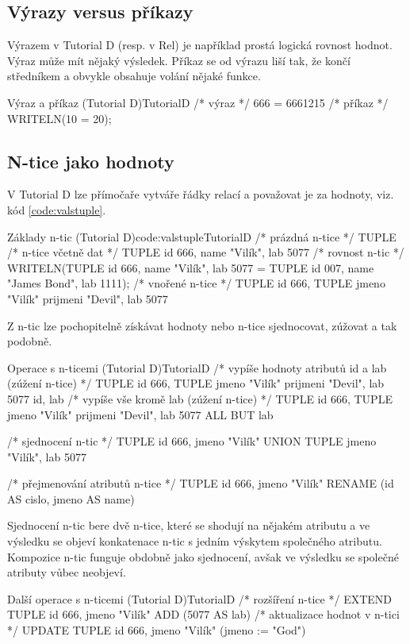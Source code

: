 \subsection{Výrazy versus příkazy}
Výrazem v Tutorial D (resp. v Rel) je například prostá logická rovnost hodnot. Výraz může mít nějaký výsledek. Příkaz se od výrazu liší tak, že končí středníkem a obvykle obsahuje volání nějaké funkce.
\begin{upcode}{Výraz a příkaz (Tutorial D)}{}{TutorialD}
/* výraz */
666 = 6661215
/* příkaz */
WRITELN(10 = 20);
\end{upcode}

\subsection{N-tice jako hodnoty}
V Tutorial D lze přímočaře vytváře řádky relací a považovat je za hodnoty, viz. kód \ref{code:valstuple}.
\begin{upcode}{Základy n-tic (Tutorial D)}{code:valstuple}{TutorialD}
/* prázdná n-tice */
TUPLE {}
/* n-tice včetně dat */
TUPLE {id 666, name "Vilík", lab 5077}
/* rovnost n-tic */
WRITELN(TUPLE {id 666, name "Vilík", lab 5077} = TUPLE {id 007, name "James Bond", lab 1111});
/* vnořené n-tice */
TUPLE {id 666, TUPLE {jmeno "Vilík" prijmeni "Devil"}, lab 5077}
\end{upcode}
Z n-tic lze pochopitelně získávat hodnoty nebo n-tice sjednocovat, zúžovat a tak podobně.
\begin{upcode}{Operace s n-ticemi (Tutorial D)}{}{TutorialD}
/* vypíše hodnoty atributů id a lab (zúžení n-tice) */
TUPLE {id 666, TUPLE {jmeno "Vilík" prijmeni "Devil"}, lab 5077} {id, lab}
/* vypíše vše kromě lab (zúžení n-tice) */
TUPLE {id 666, TUPLE {jmeno "Vilík" prijmeni "Devil"}, lab 5077} {ALL BUT lab}

/* sjednocení n-tic */
TUPLE {id 666, jmeno "Vilík"} UNION TUPLE {jmeno "Vilík", lab 5077}

/* přejmenování atributů n-tice */
TUPLE {id 666, jmeno "Vilík"} RENAME (id AS cislo, jmeno AS name)
\end{upcode}
Sjednocení n-tic bere dvě n-tice, které se shodují na nějakém atributu a ve výsledku se objeví konkatenace n-tic s jedním výskytem společného atributu. Kompozice n-tic funguje obdobně jako sjednocení, avšak ve výsledku se společné atributy vůbec neobjeví.
\begin{upcode}{Další operace s n-ticemi (Tutorial D)}{}{TutorialD}
/* rozšíření n-tice */
EXTEND TUPLE {id 666, jmeno "Vilík"} ADD (5077 AS lab)
/* aktualizace hodnot v n-tici */
UPDATE TUPLE {id 666, jmeno "Vilík"} (jmeno := "God")
\end{upcode}

